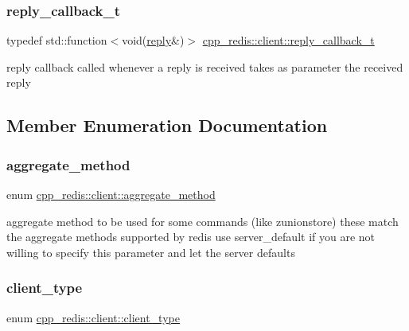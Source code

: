 \subsubsection{\texorpdfstring{reply\+\_\+callback\+\_\+t}{reply\_callback\_t}}
{\footnotesize\ttfamily typedef std\+::function$<$void(\hyperlink{classcpp__redis_1_1reply}{reply}\&)$>$ \hyperlink{classcpp__redis_1_1client_a061a1140d36d2eaeda82b09a0bb3f9f2}{cpp\+\_\+redis\+::client\+::reply\+\_\+callback\+\_\+t}}

reply callback called whenever a reply is received takes as parameter the received reply 

\subsection{Member Enumeration Documentation}
\mbox{\label{classcpp__redis_1_1client_aa197ca5b36da793c701d3ba388ec4946}} 
\subsubsection{\texorpdfstring{aggregate\+\_\+method}{aggregate\_method}}
{\footnotesize\ttfamily enum \hyperlink{classcpp__redis_1_1client_aa197ca5b36da793c701d3ba388ec4946}{cpp\+\_\+redis\+::client\+::aggregate\+\_\+method}\hspace{0.3cm}{\ttfamily [strong]}}

aggregate method to be used for some commands (like zunionstore) these match the aggregate methods supported by redis use server\+\_\+default if you are not willing to specify this parameter and let the server defaults \mbox{\label{classcpp__redis_1_1client_a388877b01b4e045cddb138e70a68e000}} 
\subsubsection{\texorpdfstring{client\+\_\+type}{client\_type}}
{\footnotesize\ttfamily enum \hyperlink{classcpp__redis_1_1client_a388877b01b4e045cddb138e70a68e000}{cpp\+\_\+redis\+::client\+::client\+\_\+type}\hspace{0.3cm}{\ttfamily [strong]}}

